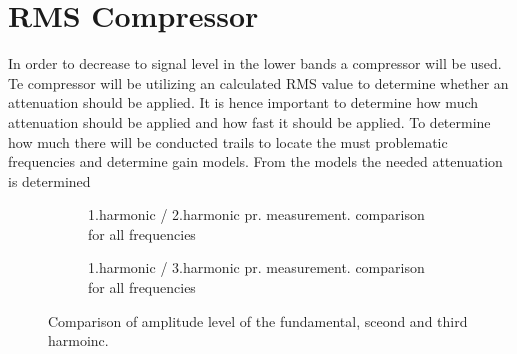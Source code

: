 \chapter{RMS Compressor}

In order to decrease to signal level in the lower bands a compressor will be used. Te compressor will be utilizing an calculated RMS value to determine whether an attenuation should be applied. It is hence important to determine how much attenuation should be applied and how fast it should be applied. To determine how much there will be conducted trails to locate the must problematic frequencies and determine gain models. From the models the needed attenuation is determined 


\begin{figure}[H]
\begin{subfigure}[t]{0.45\textwidth}
    \centering
    
    \caption{1.harmonic / 2.harmonic pr. measurement. comparison for all frequencies}
\label{fig:com_mic12AllRMS}
\end{subfigure}
\hspace{3mm}
\begin{subfigure}[t]{0.45\textwidth}
    \centering
    
    \caption{1.harmonic / 3.harmonic pr. measurement. comparison for all frequencies}
\label{fig:com_mic13AllRMS}
\end{subfigure}
\caption{Comparison of amplitude level of the fundamental, sceond and third harmoinc.}
\end{figure}









%